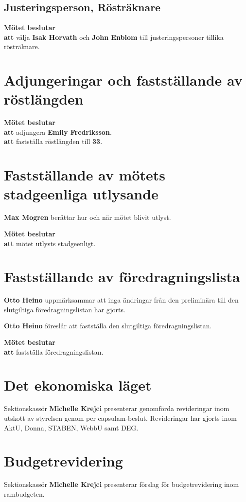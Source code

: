 \documentclass{datateknologsektionen-document}
\newcommand{\ind}{\hspace*{2em}}
\newcommand{\motetbeslutar}{\textbf{Mötet beslutar}}
\newcommand{\att}{\\\ind\textbf{att}}
\begin{document}
\subsection{Justeringsperson, Rösträknare}
\motetbeslutar\att{} välja \textbf{Isak Horvath} och \textbf{John Enblom} till justeringspersoner tillika rösträknare.




\section{Adjungeringar och fastställande av röstlängden}
\motetbeslutar
\att{} adjungera \textbf{Emily Fredriksson}.
\att{} fastställa röstlängden till \textbf{33}.





\section{Fastställande av mötets stadgeenliga utlysande}
\textbf{Max Mogren} berättar hur och när mötet blivit utlyst.

\motetbeslutar\att{} mötet utlysts stadgeenligt.



\section{Fastställande av föredragningslista}
\textbf{Otto Heino} uppmärksammar att inga ändringar från den preliminära till den slutgiltiga föredragningslistan har gjorts.

\textbf{Otto Heino} föreslår att fastställa den slutgiltiga föredragningslistan.

\motetbeslutar\att{} fastställa föredragningslistan.




\section{Det ekonomiska läget}
Sektionskassör \textbf{Michelle Krejci} presenterar genomförda revideringar inom utskott av styrelsen genom per capsulam-beslut. Revideringar har gjorts inom AktU, Donna, STABEN, WebbU samt DEG.



\section{Budgetrevidering}
Sektionskassör \textbf{Michelle Krejci} presenterar förslag för budgetrevidering inom rambudgeten.
\end{document}
